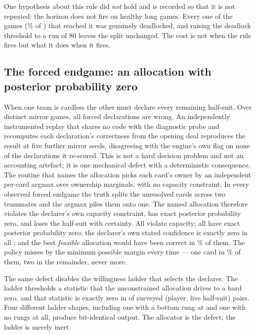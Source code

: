 One hypothesis about this rule did \emph{not} hold and is recorded so that it is
not repeated: the horizon does not fire on healthy long games. Every one of the
\numHorizonGames{} games (\numHorizonReach\% of \numLowConfGames{}) that reached it was genuinely deadlocked,
and raising the deadlock threshold to a run of 80 leaves the split unchanged. The
cost is not when the rule fires but what it does when it fires.

\subsection{The forced endgame: an allocation with posterior probability zero}
\label{sec:diag-forced}

When one team is cardless the other must declare every remaining half-suit. Over
\numForcedGames{} distinct mirror games, all \numForcedN{} forced declarations
are wrong. An independently instrumented replay that shares no code with the
diagnostic probe and recomputes each declaration's correctness from the opening
deal reproduces the result at five further mirror seeds, disagreeing with the
engine's own flag on none of the declarations it re-scored.
This is not a hard decision problem and not an accounting artefact; it is one
mechanical defect with a deterministic consequence. The routine that names the
allocation picks each card's owner by an independent per-card argmax over
ownership marginals, with no capacity constraint. In every observed forced
endgame the truth splits the unresolved cards across two teammates and the argmax
piles them onto one. The named allocation therefore violates the declarer's own
capacity constraint, has exact posterior probability zero, and loses the
half-suit with certainty. All \numForcedN{} violate capacity; all
\numForcedN{} have exact posterior probability zero; the declarer's own stated
confidence is exactly zero in all \numForcedN{}; and the best \emph{feasible}
allocation would have been correct in \numFeasibleRight\% of them. The policy
misses by the minimum possible margin every time --- one card in
\numForcedMissRate\% of them, two in the remainder, never more.

The same defect disables the willingness ladder that selects the declarer. The
ladder thresholds a statistic that the unconstrained allocation drives to a hard
zero, and that statistic is exactly zero in \numRungZeroPairs{} of
\numRungZeroPairs{} surveyed (player, live half-suit) pairs. Four different
ladder shapes, including one with a bottom rung at \numLadderBottomRung{} and one with no rungs at
all, produce bit-identical output. The allocator is the defect; the ladder is
merely inert.


